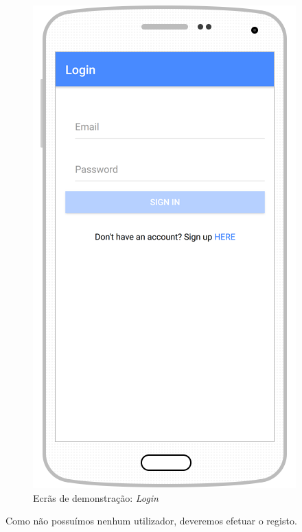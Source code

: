 \begin{figure}[H]
  \centering
        \includegraphics[scale=0.6]{img/demo/login.png}
  \caption{Ecrãs de demonstração: \textit{Login}}
\end{figure}

Como não possuímos nenhum utilizador, deveremos efetuar o registo.

